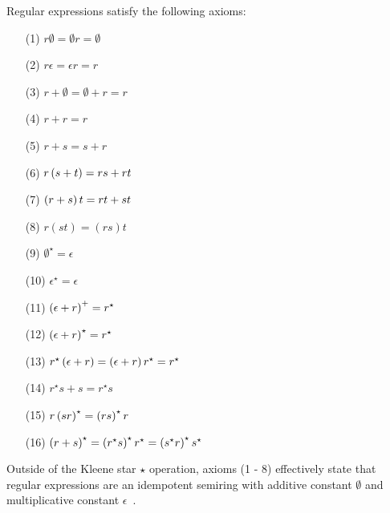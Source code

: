 \begin{theorem}
Regular expressions satisfy the following axioms:
\begin{enumerate}
  \item[(1)]
    \(r \emptyset = \emptyset r = \emptyset\)

  \item[(2)]
    \(r \epsilon = \epsilon r = r\)

  \item[(3)]
    \(r + \emptyset = \emptyset + r = r\)

  \item[(4)]
    \(r + r = r\)

  \item[(5)]
    \(r + s = s + r\)

  \item[(6)]
    \(r\left(s + t\right) = rs + rt\)

  \item[(7)]
    \(\left(r + s\right)t = rt + st\)

  \item[(8)]
    \(r(st) = (rs)t\)

  \item[(9)]
    \(\emptyset^\star = \epsilon\)

  \item[(10)]
    \(\epsilon^\star = \epsilon\)

  \item[(11)]
    \(\left(\epsilon + r\right)^+ = r^\star\)

  \item[(12)]
    \(\left(\epsilon + r\right)^\star = r^\star\)

  \item[(13)]
    \(r^\star \left(\epsilon + r\right) = \left(\epsilon + r\right)r^\star = r^\star\)

  \item[(14)]
    \(r^\star s + s = r^\star s\)

  \item[(15)]
    \(r\left(sr\right)^\star = \left(rs\right)^\star r\)

  \item[(16)]
    \(\left(r + s\right)^\star = \left(r^\star s\right)^\star r^\star = \left(s^\star r\right)^\star s^\star\)

\end{enumerate}

\end{theorem}

Outside of the Kleene star \(\star\) operation, axioms (1 - 8)
effectively state that regular expressions are an
idempotent semiring with additive constant \(\emptyset\) and multiplicative
constant \(\epsilon\)~\cite{infoandcomp-kozen1994kleenealg}.



